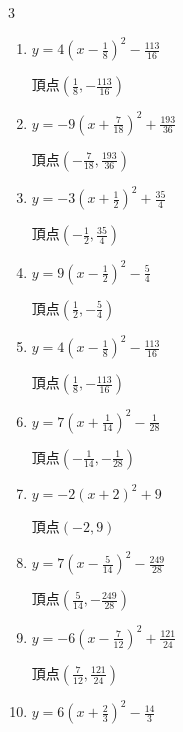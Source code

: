 \begin{multicols}{3}
\begin{enumerate}
  \item $\displaystyle y=4\left( x-\frac{1}{8}\right)^{2}-\frac{113}{16}$

        $\displaystyle 頂点\left( \frac{1}{8} , -\frac{113}{16} \right)$

  \item $\displaystyle y=-9\left( x+\frac{7}{18}\right)^{2}+\frac{193}{36}$

        $\displaystyle 頂点\left( -\frac{7}{18} , \frac{193}{36} \right)$

\columnbreak %

\resetques

  \item $\displaystyle y=-3\left( x+\frac{1}{2}\right)^{2}+\frac{35}{4}$

        $\displaystyle 頂点\left( -\frac{1}{2} , \frac{35}{4} \right)$

  \item $\displaystyle y=9\left( x-\frac{1}{2}\right)^{2}-\frac{5}{4}$

        $\displaystyle 頂点\left( \frac{1}{2} , -\frac{5}{4} \right)$

  \item $\displaystyle y=4\left( x-\frac{1}{8}\right)^{2}-\frac{113}{16}$

        $\displaystyle 頂点\left( \frac{1}{8} , -\frac{113}{16} \right)$

  \item $\displaystyle y=7\left( x+\frac{1}{14}\right)^{2}-\frac{1}{28}$

        $\displaystyle 頂点\left( -\frac{1}{14} , -\frac{1}{28} \right)$

  \item $\displaystyle y=-2\left( x+2\right)^{2}+9$

        $\displaystyle 頂点\left( -2 , 9 \right)$

  \item $\displaystyle y=7\left( x-\frac{5}{14}\right)^{2}-\frac{249}{28}$

        $\displaystyle 頂点\left( \frac{5}{14} , -\frac{249}{28} \right)$

  \item $\displaystyle y=-6\left( x-\frac{7}{12}\right)^{2}+\frac{121}{24}$

        $\displaystyle 頂点\left( \frac{7}{12} , \frac{121}{24} \right)$

  \item $\displaystyle y=6\left( x+\frac{2}{3}\right)^{2}-\frac{14}{3}$


\end{enumerate}
\end{multicols}
